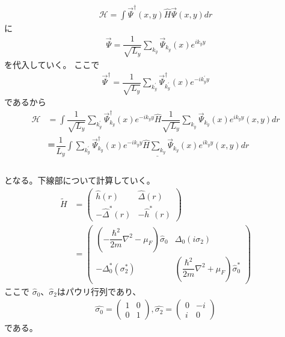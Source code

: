 \documentclass{jarticle}
\begin{document}
	    \begin{align}
	   \mathcal{H}=\int\vec{\Psi}^\dagger(x,y)\hat{H}\vec{\Psi}(x,y)dr
	   \end{align}
	   に
	  \begin{align}
	   \vec{\Psi}=\dfrac{1}{\sqrt{L_y}}\displaystyle\sum_{k_y}\vec{\Psi}_{k_y}(x)e^{ik_yy}
	  \end{align}
	  を代入していく。
	  ここで
	  \begin{align}
	  \vec{\Psi}^\dagger=\dfrac{1}{\sqrt{L_y}}\displaystyle\sum_{k_y^{'}}\vec{\Psi}^\dagger_{k_y^{'}}(x)e^{-ik_y^{'}y}
	  \end{align}
	  であるから
	   \begin{align}
	  \mathcal{H}&=\int\dfrac{1}{\sqrt{L_y}}\displaystyle\sum_{k_y^{'}}\vec{\Psi}^\dagger_{k_y}(x)e^{-ik_yy}\hat{H}\dfrac{1}{\sqrt{L_y}}\displaystyle\sum_{k_y}\vec{\Psi}_{k_y}(x)e^{ik_yy}(x,y)dr\\&＝\dfrac{1}{L_y}\underline{\int\displaystyle\sum_{k_y^{'}}\vec{\Psi}^\dagger_{k_y}(x)e^{-ik_yy}\hat{H}\displaystyle\sum_{k_y}\vec{\Psi}_{k_y}(x)e^{ik_yy}(x,y)dr}\\
	  \label{star}
	  \end{align}
	   \\となる。下線部について計算していく。
  \begin{align}
  \tilde{H}&=
  \begin{pmatrix}
  \hat{h}(r) & \hat{\Delta}(r) \\
  -\hat{\Delta}^{*}(r) & -\hat{h}^{*}(r)
  \end{pmatrix}
   \\&=
     \begin{pmatrix}
   (-\dfrac{\hbar^2}{2m}\nabla^2-\mu_F)\hat{\sigma}_0 & \Delta_0(i\sigma_2) \\
   -\Delta^{*}_0(\sigma^{*}_2) & (\dfrac{\hbar^2}{2m}\nabla^2+\mu_F)\hat{\sigma}^{*}_0
   \end{pmatrix}
  \end{align}
  ここで
  $\hat\sigma_0$、$\hat\sigma_2$はパウリ行列であり、
  \begin{align}
  \hat{\sigma_0}=
  \begin{pmatrix}
  1 & 0 \\
  0 & 1
  \end{pmatrix},
  \hat{\sigma_2}=
  \begin{pmatrix}
  0 & -i \\
  i & 0
  \end{pmatrix}
  \end{align}
  である。
\end{document}
